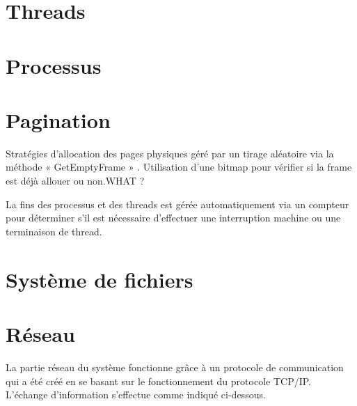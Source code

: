 \documentclass[12pt]{report}
\begin{document}
\section{Threads}



%
%

\section{Processus}



\section{Pagination}


Stratégies d’allocation des pages physiques géré par un tirage aléatoire via la méthode « GetEmptyFrame » . Utilisation d’une bitmap pour vérifier si la frame est déjà allouer ou non.\color{red}WHAT ?\color{black}

La fins des processus et des threads est gérée automatiquement via un compteur pour déterminer s'il est nécessaire d'effectuer une interruption machine ou une terminaison de thread.

\section{Système de fichiers}


\section{Réseau}

La partie réseau du système fonctionne grâce à un protocole de communication qui a été créé en se basant sur le fonctionnement du protocole TCP/IP. L'échange d'information s'effectue comme indiqué ci-dessous.
\end{document}
